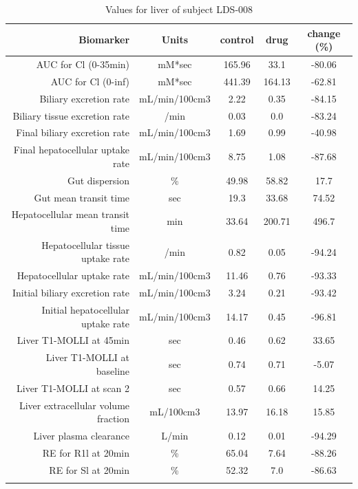 \documentclass{epflreport}%
\begin{document}
%
\clearpage%
\begin{longtable}{rcccc}%
\hline%
Biomarker&Units&control&drug&change (\%)\\%
\hline%
AUC for Cl (0{-}35min)&mM*sec&165.96&33.1&{-}80.06\\%
AUC for Cl (0{-}inf)&mM*sec&441.39&164.13&{-}62.81\\%
Biliary excretion rate&mL/min/100cm3&2.22&0.35&{-}84.15\\%
Biliary tissue excretion rate&/min&0.03&0.0&{-}83.24\\%
Final biliary excretion rate&mL/min/100cm3&1.69&0.99&{-}40.98\\%
Final hepatocellular uptake rate&mL/min/100cm3&8.75&1.08&{-}87.68\\%
Gut dispersion&\%&49.98&58.82&17.7\\%
Gut mean transit time&sec&19.3&33.68&74.52\\%
Hepatocellular mean transit time&min&33.64&200.71&496.7\\%
Hepatocellular tissue uptake rate&/min&0.82&0.05&{-}94.24\\%
Hepatocellular uptake rate&mL/min/100cm3&11.46&0.76&{-}93.33\\%
Initial biliary excretion rate&mL/min/100cm3&3.24&0.21&{-}93.42\\%
Initial hepatocellular uptake rate&mL/min/100cm3&14.17&0.45&{-}96.81\\%
Liver T1{-}MOLLI at 45min&sec&0.46&0.62&33.65\\%
Liver T1{-}MOLLI at baseline&sec&0.74&0.71&{-}5.07\\%
Liver T1{-}MOLLI at scan 2&sec&0.57&0.66&14.25\\%
Liver extracellular volume fraction&mL/100cm3&13.97&16.18&15.85\\%
Liver plasma clearance&L/min&0.12&0.01&{-}94.29\\%
RE for R1l at 20min&\%&65.04&7.64&{-}88.26\\%
RE for Sl at 20min&\%&52.32&7.0&{-}86.63\\%
\hline%
\caption{Values for liver of subject LDS-008} \\%
\end{longtable}%
\end{document}
